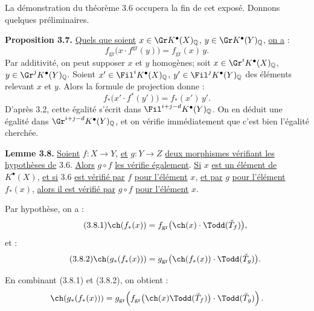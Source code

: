 
La démonstration du
théorème 3.6 occupera la fin de cet exposé. Donnons quelques préliminaires.

\textbf{Proposition 3.7.} \uline{Quels que soient} $x\in \Gr K^{\bullet}(X)_{\mathbb Q}$, $y\in \Gr K^{\bullet}(Y)_{\mathbb Q}$, \uline{on a} :
\[
 f_{\mathrm{gr}}\bigl(x\cdot f^{\mathrm{gr}}(y)\bigr)
 =
 f_{\mathrm{gr}}(x)\,y .
\]
Par additivité, on peut supposer \(x\) et \(y\) homogènes; soit $x\in \Gr^iK^{\bullet}(X)_{\mathbb Q}$, $y\in \Gr^jK^{\bullet}(Y)_{\mathbb Q}$.
Soient $x'\in \Fil^iK^{\bullet}(X)_{\mathbb Q}$, $y'\in \Fil^jK^{\bullet}(Y)_{\mathbb Q}$ des éléments relevant \(x\) et \(y\). Alors la formule de projection donne :
\[
 f_*\bigl(x'\cdot f^*(y')\bigr)=f_*(x')\,y'.
\]
D'après 3.2, cette égalité s'écrit dans
\(\Fil^{i+j-d}K^{\bullet}(Y)_{\mathbb Q}\). On en déduit une égalité dans
\(\Gr^{i+j-d}K^{\bullet}(Y)_{\mathbb Q}\), et on vérifie immédiatement que c'est bien l'égalité cherchée.

\textbf{Lemme 3.8.} \uline{Soient} \(f:X\to Y\), \uline{et} \(g:Y\to Z\) \uline{deux morphismes vérifiant les hypothèses de} 3.6. \uline{Alors} \(g\circ f\) \uline{les vérifie également}. \uline{Si} \(x\) \uline{est un élément de} \(K^{\bullet}(X)\), \uline{et si} 3.6 \uline{est vérifié par} \(f\) \uline{pour l'élément} \(x\), \uline{et par} \(g\) \uline{pour l'élément} \(f_*(x)\), \uline{alors il est vérifié par} \(g\circ f\) \uline{pour l'élément} \(x\).

Par hypothèse, on a :
\begin{equation}\tag{3.8.1}
 \ch(f_*(x))=
 f_{\mathrm{gr}}\bigl(\ch(x)\cdot\Todd(\check T_f)\bigr),
\end{equation}
et :
\begin{equation}\tag{3.8.2}
 \ch(g_*(f_*(x)))=
 g_{\mathrm{gr}}\bigl(\ch(f_*(x))\cdot\Todd(\check T_g)\bigr).
\end{equation}

En combinant (3.8.1) et (3.8.2), on obtient :
\[
\ch(g_*(f_*(x)))=
g_{\mathrm{gr}}\!\left(
 f_{\mathrm{gr}}\bigl(\ch(x)\Todd(\check T_f)\bigr)\cdot \Todd(\check T_g)
\right).
\]
